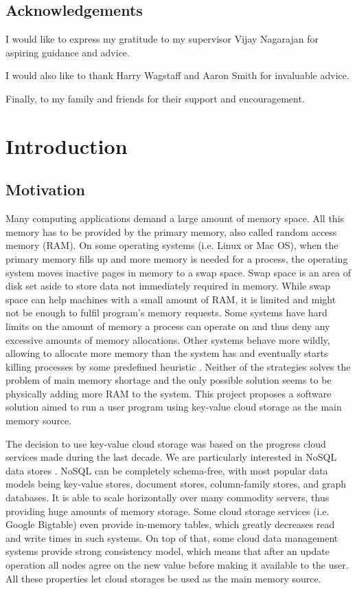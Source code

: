 \documentclass[bsc,frontabs,twoside,singlespacing,parskip,deptreport]{infthesis}     %
\begin{document}
\section*{Acknowledgements}

I would like to express my gratitude to my supervisor Vijay Nagarajan for aspiring guidance and advice.

I would also like to thank Harry Wagstaff and Aaron Smith for invaluable advice.

Finally, to my family and friends for their support and encouragement.

\tableofcontents



\chapter{Introduction}

\section{Motivation}

Many computing applications demand a large amount of memory space. All this memory has to be provided by the primary memory, also called random access memory (RAM). On some operating systems (i.e. Linux or Mac OS), when the primary memory fills up and more memory is needed for a process, the operating system moves inactive pages in memory to a swap space. Swap space is an area of disk set aside to store data not immediately required in memory. While swap space can help machines with a small amount of RAM, it is limited and might not be enough to fulfil program's memory requests. Some systems have hard limits on the amount of memory a process can operate on and thus deny any excessive amounts of memory allocations. Other systems behave more wildly, allowing to allocate more memory than the system has and eventually starts killing processes by some predefined heuristic \citep{run_out_of_mem}. Neither of the strategies solves the problem of main memory shortage and the only possible solution seems to be physically adding more RAM to the system. This project proposes a software solution aimed to run a user program using key-value cloud storage as the main memory source.

The decision to use key-value cloud storage was based on the progress cloud services made during the last decade. We are particularly interested in NoSQL data stores \citep{nosql-data-stores}. NoSQL can be completely schema-free, with most popular data models being key-value stores, document stores, column-family stores, and graph databases. It is able to scale horizontally over many commodity servers, thus providing huge amounts of memory storage. Some cloud storage services (i.e. Google Bigtable) even provide in-memory tables, which greatly decreases read and write times in such systems.  On top of that, some cloud data management systems provide strong consistency model, which means that after an update operation all nodes agree on the new value before making it available to the user. All these properties let cloud storages be used as the main memory source.
\end{document}
